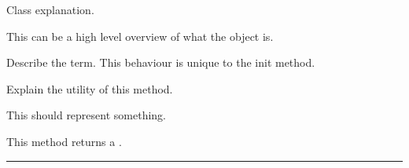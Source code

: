 \documentclass[letterpaper,10pt,english]{sphinxmanual}
\begin{document}
\begin{fulllineitems}
\label{\detokenize{index:example.Example}}
\pysigstartsignatures
{}
\pysigstopsignatures
\sphinxAtStartPar
Class explanation.

\sphinxAtStartPar
This can be a high level overview of what the object is.

\begin{fulllineitems}
\label{\detokenize{index:example.Example.arg1}}
\pysigstartsignatures
{}
\pysigstopsignatures
\sphinxAtStartPar
Describe the  term.
This behaviour is unique to the init method.

\end{fulllineitems}


\begin{fulllineitems}
\label{\detokenize{index:example.Example.usefulMethod}}
\pysigstartsignatures
{}
\pysigstopsignatures
\sphinxAtStartPar
Explain the utility of this method.
\begin{description}
\begin{description}
\sphinxAtStartPar
This  should represent something.

\end{description}

\sphinxAtStartPar
This method returns a .

\end{description}

\end{fulllineitems}


\end{fulllineitems}



\bigskip\hrule\bigskip
\end{document}
